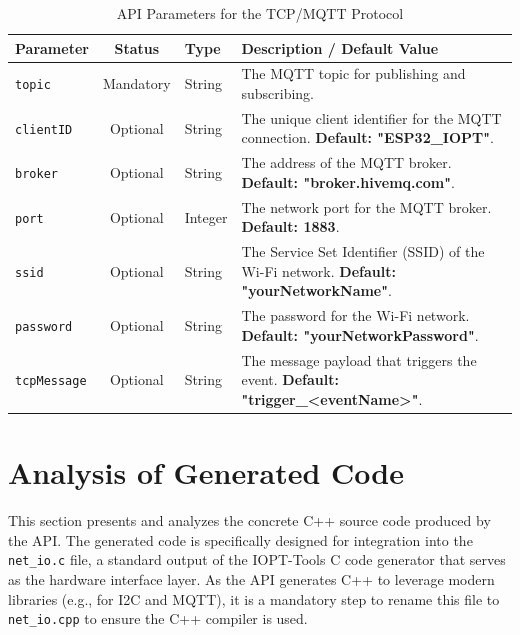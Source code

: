 \begin{table}[h!]
    \centering
    \caption{API Parameters for the TCP/MQTT Protocol}
    \label{tab:tcp_params}
    \begin{tabular}{|l|c|l|p{6cm}|}
        \hline
        \textbf{Parameter} & \textbf{Status} & \textbf{Type} & \textbf{Description / Default Value} \\ \hline
        \texttt{topic} & Mandatory & String & The MQTT topic for publishing and subscribing. \\ \hline
        \texttt{clientID} & Optional & String & The unique client identifier for the MQTT connection. \textbf{Default: "ESP32\_IOPT"}. \\ \hline
        \texttt{broker} & Optional & String & The address of the MQTT broker. \textbf{Default: "broker.hivemq.com"}. \\ \hline
        \texttt{port} & Optional & Integer & The network port for the MQTT broker. \textbf{Default: 1883}. \\ \hline
        \texttt{ssid} & Optional & String & The Service Set Identifier (SSID) of the Wi-Fi network. \textbf{Default: "yourNetworkName"}. \\ \hline
        \texttt{password} & Optional & String & The password for the Wi-Fi network. \textbf{Default: "yourNetworkPassword"}. \\ \hline
        \texttt{tcpMessage} & Optional & String & The message payload that triggers the event. \textbf{Default: "trigger\_<eventName>"}. \\ \hline
    \end{tabular}
\end{table}




\section{Analysis of Generated Code}
\label{sec:analysis_of_code}

This section presents and analyzes the concrete C++ source code produced by the API. The generated code is specifically designed for integration into the \texttt{net\_io.c} file, a standard output of the IOPT-Tools C code generator that serves as the hardware interface layer. As the API generates C++ to leverage modern libraries (e.g., for I2C and MQTT), it is a mandatory step to rename this file to \texttt{net\_io.cpp} to ensure the C++ compiler is used.

